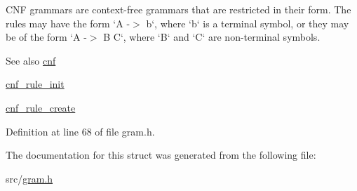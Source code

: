 \-C\-N\-F grammars are context-\/free grammars that are restricted in their form. \-The rules may have the form `\-A -\/$>$ b`, where `b` is a terminal symbol, or they may be of the form `\-A -\/$>$ \-B \-C`, where `\-B` and `\-C` are non-\/terminal symbols.

\begin{DoxySeeAlso}{\-See also}
\hyperlink{structcnf}{cnf} 

\hyperlink{gram_8h_a8273268c6def6207571b2e197ad77825}{cnf\-\_\-rule\-\_\-init} 

\hyperlink{gram_8h_af35cacdaab51e6aa556d85147def56f4}{cnf\-\_\-rule\-\_\-create} 
\end{DoxySeeAlso}


\-Definition at line 68 of file gram.\-h.



\-The documentation for this struct was generated from the following file\-:\begin{DoxyCompactItemize}
\item 
src/\hyperlink{gram_8h}{gram.\-h}\end{DoxyCompactItemize}
